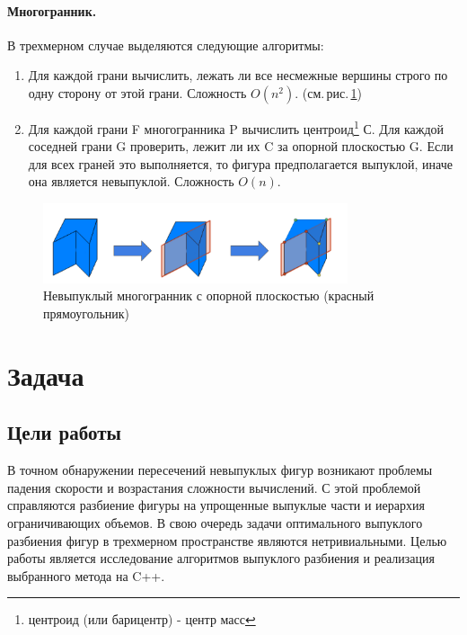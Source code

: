 \documentclass[11pt,a4paper]{extarticle}
\begin{document}
			\paragraph{Многогранник.} В трехмерном случае выделяются следующие алгоритмы:
			\begin{enumerate}
				\item Для каждой грани вычислить, лежать ли все несмежные вершины строго по одну сторону от этой грани. Сложность $O(n^2)$. (см.\,рис.\,\ref{con_polyhedra})
				\item Для каждой грани F многогранника P вычислить центроид\footnote{центроид (или барицентр) - центр масс} С. Для каждой соседней грани G проверить, лежит ли их C за опорной плоскостью G. Если для всех граней это выполняется, то фигура предполагается выпуклой, иначе она является невыпуклой. Сложность $O(n)$.
			\end{enumerate}	
			\begin{figure}[ht]
				\centering
				\includegraphics[width=0.8\textwidth]{con_polyhedra}
				\caption{Невыпуклый многогранник с опорной плоскостью (красный прямоугольник)}
				\label{con_polyhedra}
			\end{figure}
	
	
	\newpage

	\section{Задача}
		\subsection{Цели работы}
			В точном обнаружении пересечений невыпуклых фигур возникают проблемы падения скорости и возрастания сложности вычислений.
			С этой проблемой справляются разбиение фигуры на упрощенные выпуклые части и иерархия ограничивающих объемов.
			В свою очередь задачи оптимального выпуклого разбиения фигур в трехмерном пространстве являются нетривиальными.
			Целью работы является исследование алгоритмов выпуклого разбиения и реализация выбранного метода на C++. 
\end{document}
